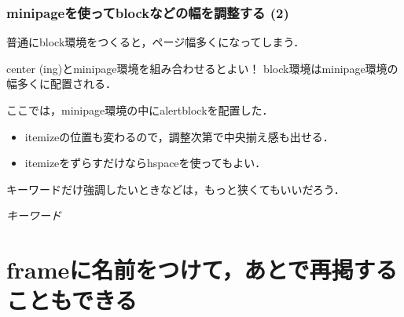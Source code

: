 \documentclass[unicode, 9pt, aspectratio=169]{beamer}
\begin{document}
\begin{frame}
  \frametitle{minipageを使ってblockなどの幅を調整する (2)}
  \centering
  \begin{block}{}
    \centering
    普通にblock環境をつくると，ページ幅多くになってしまう．
  \end{block}

  \begin{minipage}{.8\linewidth}
    \begin{alertblock}{center (ing)とminipage環境を組み合わせるとよい！}
      \centering
      block環境はminipage環境の幅多くに配置される．

      ここでは，minipage環境の中にalertblockを配置した．
    \end{alertblock}

    \begin{itemize}
      \item itemizeの位置も変わるので，調整次第で中央揃え感も出せる．
      \item[＊] itemizeをずらすだけならhspaceを使ってもよい．
    \end{itemize}
  \end{minipage}

  キーワードだけ強調したいときなどは，もっと狭くてもいいだろう．
  \begin{minipage}{.5\linewidth}
    \begin{exampleblock}{}
      \centering
      \Large \emph{キーワード}
    \end{exampleblock}
  \end{minipage}
\end{frame}

\section{frameに名前をつけて，あとで再掲することもできる}
\end{document}
